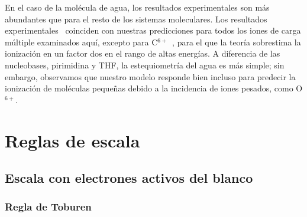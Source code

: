 En el caso de la molécula de agua, los resultados experimentales son más 
abundantes que para el resto de los sistemas moleculares. Los resultados 
experimentales~\cite{Luna2007,Bolorizadeh86,H_Rudd85,toburen80,Ohsawa05,
He_Rudd85,toburen80,Bhattacharjee:16} coinciden con 
nuestras predicciones para todos los iones de carga múltiple examinados 
aquí, excepto para C$^{6+}$~\cite{DalCapello:09,Bhattacharjee:17}, para 
el que la teoría sobrestima la ionización en un factor dos en el rango de 
altas energías. A diferencia de las nucleobases, pirimidina y THF, la 
estequiometría del agua es más simple; sin embargo, observamos que 
nuestro modelo responde bien incluso para predecir la ionización de 
moléculas pequeñas debido a la incidencia de iones pesados, como 
O$^{6+}$.

\section{Reglas de escala}
\label{sec:scaling}

\subsection{Escala con electrones activos del blanco}
\label{subsec:ne_scaling}

\subsubsection{Regla de Toburen}
\label{subsec:toburen}


